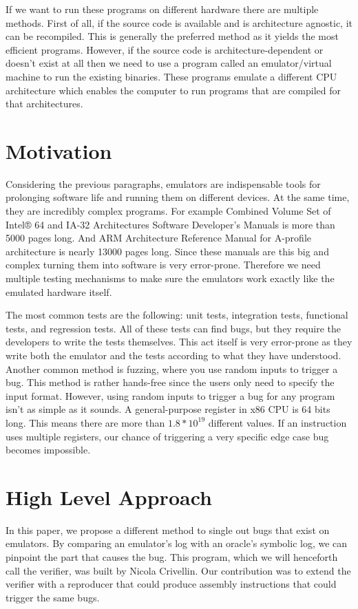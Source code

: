 If we want to run these programs on different hardware there are multiple methods.
First of all, if the source code is available and is architecture agnostic, it can be recompiled.
This is generally the preferred method as it yields the most efficient programs.
However, if the source code is architecture-dependent or doesn't exist at all then we need to use a program called an emulator/virtual machine to run the existing binaries.
These programs emulate a different CPU architecture which enables the computer to run programs that are compiled for that architectures. 

\section{Motivation}
Considering the previous paragraphs, emulators are indispensable tools for prolonging software life and running them on different devices.
At the same time, they are incredibly complex programs.
For example Combined Volume Set of Intel® 64 and IA-32 Architectures Software Developer’s Manuals \cite{intel_manual} is more than 5000 pages long.
And ARM Architecture Reference Manual for A-profile architecture \cite{ARM_manual} is nearly 13000 pages long.
Since these manuals are this big and complex turning them into software is very error-prone.
Therefore we need multiple testing mechanisms to make sure the emulators work exactly like the emulated hardware itself.

The most common tests are the following: unit tests, integration tests, functional tests, and regression tests.
All of these tests can find bugs, but they require the developers to write the tests themselves.
This act itself is very error-prone as they write both the emulator and the tests according to what they have understood.
Another common method is fuzzing, where you use random inputs to trigger a bug.
This method is rather hands-free since the users only need to specify the input format.
However, using random inputs to trigger a bug for any program isn't as simple as it sounds.
A general-purpose register in x86 CPU is 64 bits long.
This means there are more than $ 1.8 * 10^{19} $ different values.
If an instruction uses multiple registers, our chance of triggering a very specific edge case bug becomes impossible.

\section{High Level Approach}
In this paper, we propose a different method to single out bugs that exist on emulators.
By comparing an emulator's log with an oracle's symbolic log, we can pinpoint the part that causes the bug.
This program, which we will henceforth call the verifier, was built by Nicola Crivellin.
Our contribution was to extend the verifier with a reproducer that could produce assembly instructions that could trigger the same bugs.

